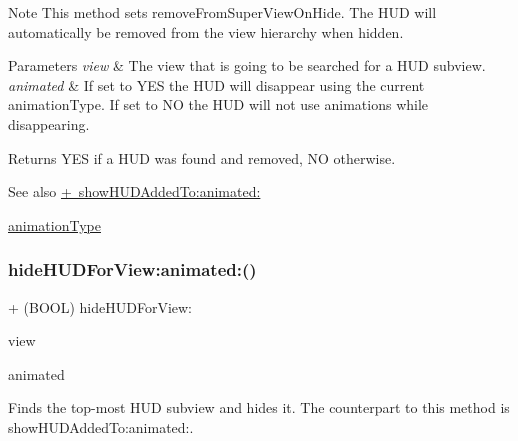 \begin{DoxyNote}{Note}
This method sets {\ttfamily remove\+From\+Super\+View\+On\+Hide}. The H\+UD will automatically be removed from the view hierarchy when hidden.
\end{DoxyNote}

\begin{DoxyParams}{Parameters}
{\em view} & The view that is going to be searched for a H\+UD subview. \\
\hline
{\em animated} & If set to Y\+ES the H\+UD will disappear using the current animation\+Type. If set to NO the H\+UD will not use animations while disappearing. \\
\hline
\end{DoxyParams}
\begin{DoxyReturn}{Returns}
Y\+ES if a H\+UD was found and removed, NO otherwise.
\end{DoxyReturn}
\begin{DoxySeeAlso}{See also}
\mbox{\hyperlink{interface_m_b_progress_h_u_d_a2a981df80fbbb85db0d6c660d5882292}{+ show\+H\+U\+D\+Added\+To\+:animated\+:}} 

\mbox{\hyperlink{interface_m_b_progress_h_u_d_a71d04bb9e2839df9377ad10d03b2e468}{animation\+Type}} 
\end{DoxySeeAlso}
\mbox{\label{interface_m_b_progress_h_u_d_a7b0826c34eea1a15d62aabd00c249666}} 
\subsubsection{\texorpdfstring{hide\+H\+U\+D\+For\+View\+:animated\+:()}{hideHUDForView:animated:()}\hspace{0.1cm}{\footnotesize\ttfamily [2/3]}}
{\footnotesize\ttfamily + (B\+O\+OL) hide\+H\+U\+D\+For\+View\+: \begin{DoxyParamCaption}\item[{(U\+I\+View $\ast$)}]{view }\item[{animated:(B\+O\+OL)}]{animated }\end{DoxyParamCaption}}

Finds the top-\/most H\+UD subview and hides it. The counterpart to this method is show\+H\+U\+D\+Added\+To\+:animated\+:.

